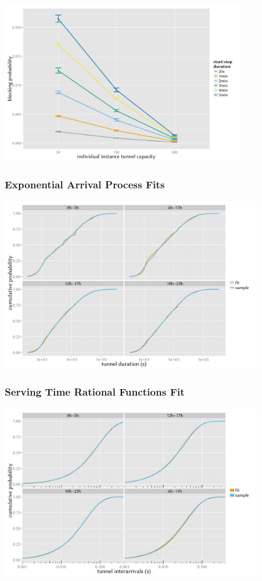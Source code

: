 \documentclass{beamer}
\begin{document}
\begin{frame}
	\frametitle{}
	\begin{center}
		\includegraphics[height=7cm]{../../chapters/04-mobilenets/images/compare-maxinstances-block.pdf}
	\end{center}
\end{frame}


\begin{frame}
	\frametitle{Exponential Arrival Process Fits}

	\begin{center}
		\includegraphics[height=7.5cm]{../../chapters/04-mobilenets/images/R-duration-fit-cdf-facets.pdf}
	\end{center}
\end{frame}

\begin{frame}
	\frametitle{Serving Time Rational Functions Fit}

	\begin{center}
		\includegraphics[height=7.5cm]{../../chapters/04-mobilenets/images/R-IAT-active-fit-cdf-facets.pdf}
	\end{center}
\end{frame}
\end{document}

